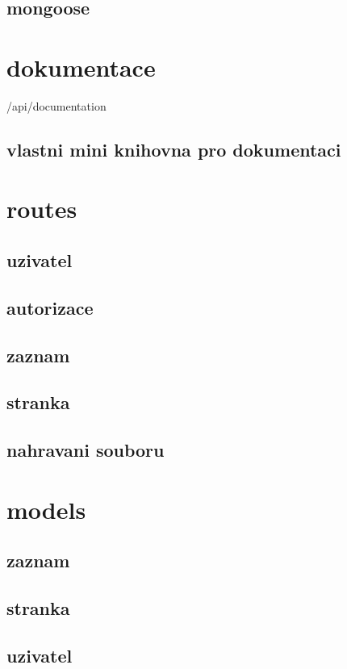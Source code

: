 \subsection{mongoose}


\section{dokumentace}
/api/documentation
\subsection{vlastni mini knihovna pro dokumentaci}

\section{routes}
\subsection{uzivatel}
\subsection{autorizace}
\subsection{zaznam}
\subsection{stranka}
\subsection{nahravani souboru}

\section{models}
\subsection{zaznam}
\subsection{stranka}
\subsection{uzivatel}

